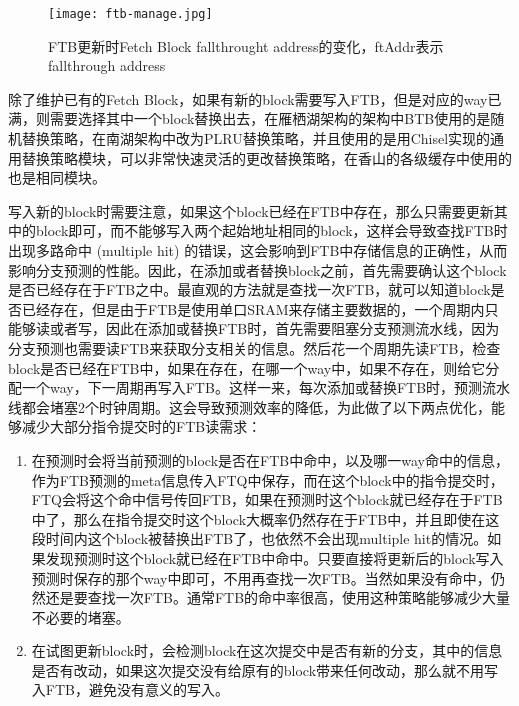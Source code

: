 \begin{figure}[htb]
	\centering
	\setlength\tabcolsep{3pt}  %
	\vspace{5pt} %
	\texttt{[image: ftb-manage.jpg]}
	\caption{FTB更新时Fetch Block fallthrought address的变化，ftAddr表示fallthrough address}
	\label{fig:figure32}
\end{figure}

除了维护已有的Fetch Block，如果有新的block需要写入FTB，但是对应的way已满，则需要选择其中一个block替换出去，在雁栖湖架构的架构中BTB使用的是随机替换策略，在南湖架构中改为PLRU替换策略，并且使用的是用Chisel实现的通用替换策略模块，可以非常快速灵活的更改替换策略，在香山的各级缓存中使用的也是相同模块。

写入新的block时需要注意，如果这个block已经在FTB中存在，那么只需要更新其中的block即可，而不能够写入两个起始地址相同的block，这样会导致查找FTB时出现多路命中 (multiple hit) 的错误，这会影响到FTB中存储信息的正确性，从而影响分支预测的性能。因此，在添加或者替换block之前，首先需要确认这个block是否已经存在于FTB之中。最直观的方法就是查找一次FTB，就可以知道block是否已经存在，但是由于FTB是使用单口SRAM来存储主要数据的，一个周期内只能够读或者写，因此在添加或替换FTB时，首先需要阻塞分支预测流水线，因为分支预测也需要读FTB来获取分支相关的信息。然后花一个周期先读FTB，检查block是否已经在FTB中，如果在存在，在哪一个way中，如果不存在，则给它分配一个way，下一周期再写入FTB。这样一来，每次添加或替换FTB时，预测流水线都会堵塞2个时钟周期。这会导致预测效率的降低，为此做了以下两点优化，能够减少大部分指令提交时的FTB读需求：

\begin{enumerate}
	\item 在预测时会将当前预测的block是否在FTB中命中，以及哪一way命中的信息，作为FTB预测的meta信息传入FTQ中保存，而在这个block中的指令提交时，FTQ会将这个命中信号传回FTB，如果在预测时这个block就已经存在于FTB中了，那么在指令提交时这个block大概率仍然存在于FTB中，并且即使在这段时间内这个block被替换出FTB了，也依然不会出现multiple hit的情况。如果发现预测时这个block就已经在FTB中命中。只要直接将更新后的block写入预测时保存的那个way中即可，不用再查找一次FTB。当然如果没有命中，仍然还是要查找一次FTB。通常FTB的命中率很高，使用这种策略能够减少大量不必要的堵塞。
	\item 在试图更新block时，会检测block在这次提交中是否有新的分支，其中的信息是否有改动，如果这次提交没有给原有的block带来任何改动，那么就不用写入FTB，避免没有意义的写入。
\end{enumerate}

